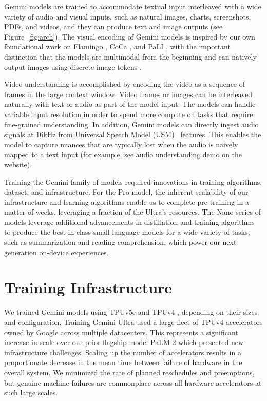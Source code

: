Gemini models are trained to accommodate textual input interleaved with a wide variety of audio and visual inputs, such as natural images, charts, screenshots, PDFs, and videos, and they can produce text and image outputs (see Figure~\ref{fig:arch}). The visual encoding of Gemini models is inspired by our own foundational work on Flamingo \citep{flamingo}, CoCa \cite{coca}, and PaLI \citep{pali}, with the important distinction that the models are multimodal from the beginning and can natively output images using discrete image tokens \cite{dalle, parti}.

Video understanding is accomplished by encoding the video as a sequence of frames in the large context window. Video frames or images can be interleaved naturally with text or audio as part of the model input. The models can handle variable input resolution in order to spend more compute on tasks that require fine-grained understanding. In addition, Gemini models can directly ingest audio signals at 16kHz from Universal Speech Model (USM)~\citep{usm} features. This enables the model to capture nuances that are typically lost when the audio is naively mapped to a text input (for example, see audio understanding demo on the \href{https://deepmind.google/gemini
}{website}).

Training the Gemini family of models required innovations in training algorithms, dataset, and infrastructure. For the Pro model, the inherent scalability of our infrastructure and learning algorithms enable us to complete pre-training in a matter of weeks, leveraging a fraction of the Ultra's resources. The Nano series of models leverage additional advancements in distillation and training algorithms to produce the best-in-class small language models for a wide variety of tasks, such as summarization and reading comprehension, which power our next generation on-device experiences.

\section{Training Infrastructure}
\label{sec:infra}

We trained Gemini models using TPUv5e and TPUv4 \cite{tpuv4}, depending on their sizes and configuration. Training Gemini Ultra used a large fleet of TPUv4 accelerators owned by Google across multiple datacenters. This represents a significant increase in scale over our prior flagship model PaLM-2 which presented new infrastructure challenges. Scaling up the number of accelerators results in a proportionate decrease in the mean time between failure of hardware in the overall system. We minimized the rate of planned reschedules and preemptions, but genuine machine failures are commonplace across all hardware accelerators at such large scales.

